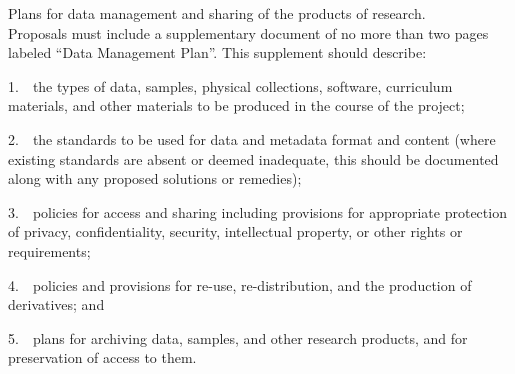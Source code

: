 










%
Plans for data management and sharing of the products of research.\\ 

Proposals must include a supplementary document of no more than
two pages labeled ``Data Management Plan''. This supplement should
describe:

\begin{list}{}{}
\item 1.~~the types of data, samples, physical collections, software, curriculum materials, and other materials to be produced in the course of the project;

\item 2.~~the standards to be used for data and metadata format and content (where existing standards are absent or deemed inadequate, this should be documented along with any proposed solutions or remedies);

\item 3.~~policies for access and sharing including provisions for appropriate protection of privacy, confidentiality, security, intellectual property, or other rights or requirements;

\item 4.~~policies and provisions for re-use, re-distribution, and the production of derivatives; and

\item 5.~~plans for archiving data, samples, and other research products, and for preservation of access to them.

\end{list}

%


